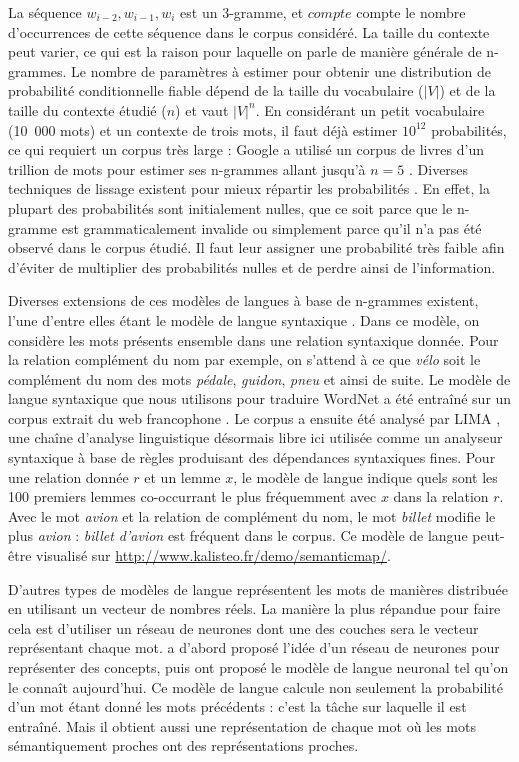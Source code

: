 La séquence $w_{i-2}, w_{i-1}, w_{i}$ est un 3-gramme, et $compte$ compte le
nombre d'occurrences de cette séquence dans le corpus considéré. La taille du
contexte peut varier, ce qui est la raison pour laquelle on parle de manière
générale de n-grammes. Le nombre de paramètres à estimer pour obtenir une
distribution de probabilité conditionnelle fiable dépend de la taille du
vocabulaire ($|V|$) et de la taille du contexte étudié ($n$) et vaut $|V|^n$.
En considérant un petit vocabulaire (10~000 mots) et un contexte de trois mots,
il faut déjà estimer $10^{12}$ probabilités, ce qui requiert un corpus très
large : Google a utilisé un corpus de livres d'un trillion de mots pour estimer
ses n-grammes allant jusqu'à $n=5$ \citep{brants2006web}. Diverses techniques
de lissage existent pour mieux répartir les probabilités
\citep[Chapitre~4]{jurafsky2008speech}. En effet, la plupart des probabilités
sont initialement nulles, que ce soit parce que le n-gramme est
grammaticalement invalide ou simplement parce qu'il n'a pas été observé dans le
corpus étudié. Il faut leur assigner une probabilité très faible afin d'éviter
de multiplier des probabilités nulles et de perdre ainsi de l'information.

Diverses extensions de ces modèles de langues à base de n-grammes existent,
l'une d'entre elles étant le modèle de langue syntaxique
\citep{lin1998automatic,goldberg2013dataset}. Dans ce modèle, on considère les
mots présents ensemble dans une relation syntaxique donnée. Pour la relation
complément du nom par exemple, on s'attend à ce que \emph{vélo} soit le
complément du nom des mots \emph{pédale}, \emph{guidon}, \emph{pneu} et ainsi
de suite. Le modèle de langue syntaxique que nous utilisons pour traduire
WordNet a été entraîné sur un corpus extrait du web francophone
\citep{grefenstette2007conquering}. Le corpus a ensuite été analysé par LIMA
\citep{besancon2010lima}, une chaîne d'analyse linguistique désormais libre ici
utilisée comme un analyseur syntaxique à base de règles produisant des
dépendances syntaxiques fines. Pour une relation donnée $r$ et un lemme $x$, le
modèle de langue indique quels sont les 100 premiers lemmes co-occurrant le
plus fréquemment avec $x$ dans la relation $r$.  Avec le mot \textit{avion} et
la relation de complément du nom, le mot \textit{billet} modifie le plus
\textit{avion} : \textit{billet d'avion} est fréquent dans le corpus. Ce modèle
de langue peut-être visualisé sur
\url{http://www.kalisteo.fr/demo/semanticmap/}.

D'autres types de modèles de langue représentent les mots de manières
distribuée en utilisant un vecteur de nombres réels. La manière la plus
répandue pour faire cela est d'utiliser un réseau de neurones dont une des
couches sera le vecteur représentant chaque mot. \cite{hinton1986learning} a
d'abord proposé l'idée d'un réseau de neurones pour représenter des concepts,
puis \cite{bengio2001neural,bengio2003neural} ont proposé le modèle de langue
neuronal tel qu'on le connaît aujourd'hui. Ce modèle de langue calcule non
seulement la probabilité d'un mot étant donné les mots précédents : c'est la
tâche sur laquelle il est entraîné. Mais il obtient aussi une représentation de
chaque mot où les mots sémantiquement proches ont des représentations proches.

